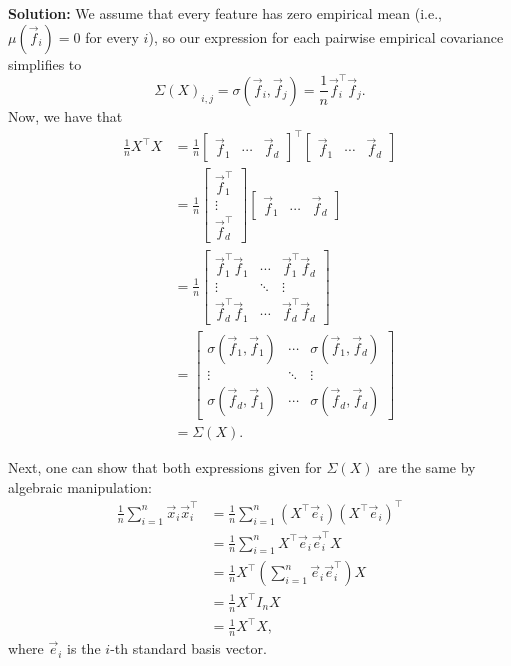 \documentclass[10pt]{article}
\theoremstyle{definition}
\theoremstyle{plain}
\begin{document}
\begin{enumerate}[label=(\alph*)]
\textbf{Solution:} We assume that every feature has zero empirical mean (i.e., $\mu(\vec{f}_i) = 0$ for every $i$), so our expression for each pairwise empirical covariance simplifies to
\begin{equation}
\Sigma(X)_{i,j} = \sigma(\vec{f}_i, \vec{f}_j) = \frac{1}{n} \vec{f}_i^\top \vec{f}_j.
\end{equation}
Now, we have that
\begin{align}
\frac{1}{n} X^\top X &= \frac{1}{n} \begin{bmatrix} \vec{f}_1 & \cdots & \vec{f}_d \end{bmatrix}^\top \begin{bmatrix} \vec{f}_1 & \cdots & \vec{f}_d \end{bmatrix} \\
&= \frac{1}{n} \begin{bmatrix} \vec{f}_1^\top \\ \vdots \\ \vec{f}_d^\top \end{bmatrix} \begin{bmatrix} \vec{f}_1 & \cdots & \vec{f}_d \end{bmatrix} \\
&= \frac{1}{n} \begin{bmatrix} \vec{f}_1^\top \vec{f}_1 & \cdots & \vec{f}_1^\top \vec{f}_d \\ \vdots & \ddots & \vdots \\ \vec{f}_d^\top \vec{f}_1 & \cdots & \vec{f}_d^\top \vec{f}_d \end{bmatrix} \\
&= \begin{bmatrix} \sigma(\vec{f}_1, \vec{f}_1) & \cdots & \sigma(\vec{f}_1, \vec{f}_d) \\ \vdots & \ddots & \vdots \\ \sigma(\vec{f}_d, \vec{f}_1) & \cdots & \sigma(\vec{f}_d, \vec{f}_d) \end{bmatrix} \\
&= \Sigma(X).
\end{align}

Next, one can show that both expressions given for $\Sigma(X)$ are the same by algebraic manipulation:
\begin{align}
\frac{1}{n} \sum_{i=1}^{n} \vec{x}_i \vec{x}_i^\top &= \frac{1}{n} \sum_{i=1}^{n} (X^\top \vec{e}_i)(X^\top \vec{e}_i)^\top \\
&= \frac{1}{n} \sum_{i=1}^{n} X^\top \vec{e}_i \vec{e}_i^\top X \\
&= \frac{1}{n} X^\top \left( \sum_{i=1}^{n} \vec{e}_i \vec{e}_i^\top \right) X \\
&= \frac{1}{n} X^\top I_n X \\
&= \frac{1}{n} X^\top X,
\end{align}
where $\vec{e}_i$ is the $i$-th standard basis vector.


\end{enumerate}
\end{document}
